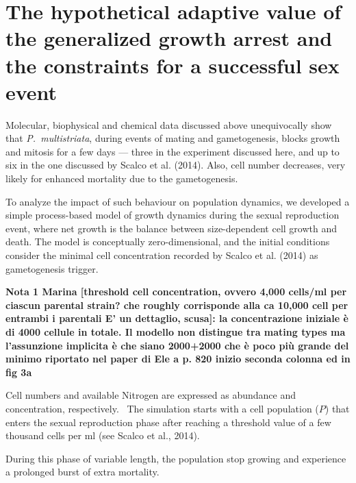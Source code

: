 \documentclass[a4paper,oneside]{article}
\begin{document}
  \section*{The hypothetical adaptive value of the generalized growth arrest and the constraints for a successful sex event}
    Molecular, biophysical and chemical data discussed above unequivocally show that \textit{P.~multistriata}, during events of mating and gametogenesis, blocks growth and mitosis for a few days --- three in the experiment discussed here, and up to six in the one discussed by Scalco et al. (2014).
    Also, cell number decreases, very likely for enhanced mortality due to the gametogenesis.

    To analyze the impact of such behaviour on population dynamics, we developed a simple process-based model of growth dynamics during the sexual reproduction event, where net growth is the balance between size-dependent cell growth and death.
    The model is conceptually zero-dimensional, and the initial conditions consider the minimal cell concentration recorded by Scalco et al. (2014) as gametogenesis trigger.

    {\color{red}\textbf{Nota 1 Marina
    {\color{blue}[threshold cell concentration, ovvero 4,000 cells/ml per ciascun parental strain? che roughly corrisponde alla ca 10,000 cell per entrambi i parentali E' un dettaglio, scusa]}:
    la concentrazione iniziale {\`e} di 4000 cellule in totale. Il modello non distingue tra mating types ma l'assunzione implicita {\`e} che siano 2000+2000 che {\`e} poco pi{\`u} grande del minimo riportato nel paper di Ele a p. 820 inizio seconda colonna ed in fig 3a}
    }

    Cell numbers and available Nitrogen are expressed as abundance and concentration, respectively.
    \
    The simulation starts with a cell population ($P$) that enters the sexual reproduction phase after reaching a threshold value of a few thousand cells per ml (see Scalco et al., 2014).

    During this phase of variable length, the population stop growing and experience a prolonged burst of extra mortality.
\end{document}
